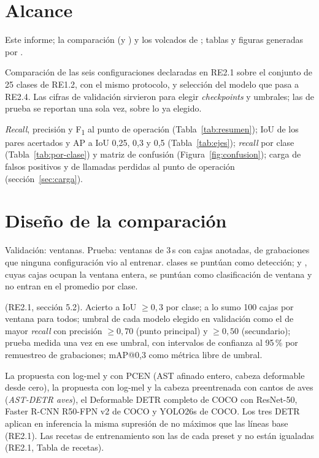 \documentclass[12pt,a4paper]{article}
\begin{document}

\section{Alcance}

 Este informe; la comparación
 (y ) y los volcados
de ; tablas y figuras generadas por
.

 Comparación de las seis configuraciones declaradas en RE2.1 sobre el
conjunto de 25 clases de RE1.2, con el mismo protocolo, y selección del modelo que pasa a
RE2.4. Las cifras de validación sirvieron para elegir \emph{checkpoints} y umbrales; las de
prueba se reportan una sola vez, sobre lo ya elegido.

 \textit{Recall}, precisión y F\textsubscript{1} al punto de operación
(Tabla~\ref{tab:resumen}); IoU de los pares acertados y AP a IoU 0,25, 0,3 y 0,5
(Tabla~\ref{tab:ejes}); \textit{recall} por clase (Tabla~\ref{tab:por-clase}) y matriz de
confusión (Figura~\ref{fig:confusion}); carga de falsos positivos y de llamadas perdidas al
punto de operación (sección~\ref{sec:carga}).

\section{Diseño de la comparación}

 Validación: \nValWindows{} ventanas. Prueba: \nTestWindows{} ventanas de 3\,s
con \nTestBoxes{} cajas anotadas, de \nTestRecordings{} grabaciones que ninguna configuración
vio al entrenar. \nDetectionClasses{} clases se puntúan como detección;  y
, cuyas cajas ocupan la ventana entera, se puntúan como clasificación de ventana
y no entran en el promedio por clase.

 (RE2.1, sección 5.2). Acierto a IoU $\geq 0{,}3$ por clase; a lo sumo 100
cajas por ventana para todos; umbral de cada modelo elegido en validación como el de mayor
\textit{recall} con precisión $\geq 0{,}70$ (punto principal) y $\geq 0{,}50$ (secundario);
prueba medida una vez en ese umbral, con intervalos de confianza al 95\,\% por remuestreo de
grabaciones; mAP@0,3 como métrica libre de umbral.

 La propuesta con log-mel y con PCEN (AST afinado entero, cabeza
deformable desde cero), la propuesta con log-mel y la cabeza preentrenada con cantos de aves
(\emph{AST-DETR aves}), el Deformable DETR completo de COCO con ResNet-50, Faster R-CNN
R50-FPN v2 de COCO y YOLO26s de COCO. Los tres DETR aplican en inferencia la misma supresión
de no máximos que las líneas base (RE2.1). Las recetas de entrenamiento son las de cada
preset y no están igualadas (RE2.1, Tabla de recetas).
\end{document}
